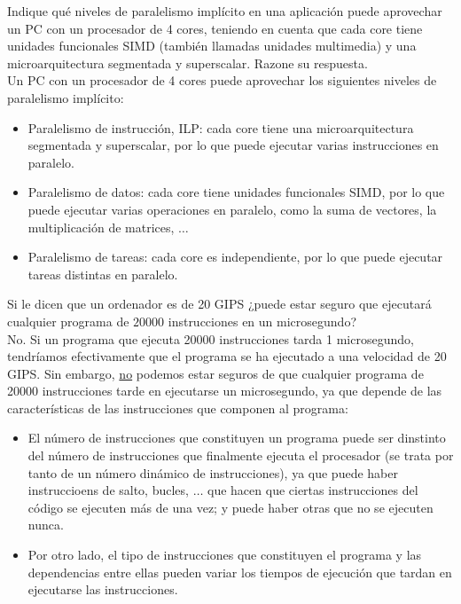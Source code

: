 \begin{cuestion}
    Indique qué niveles de paralelismo implícito en una aplicación puede aprovechar un PC con un
    procesador de 4 cores, teniendo en cuenta que cada core tiene unidades funcionales SIMD (también
    llamadas unidades multimedia) y una microarquitectura segmentada y superscalar. Razone su respuesta.\\

    Un PC con un procesador de 4 cores puede aprovechar los siguientes niveles de paralelismo implícito:
    \begin{itemize}
        \item Paralelismo de instrucción, ILP: cada core tiene una microarquitectura segmentada y superscalar, por lo que puede ejecutar varias instrucciones en paralelo.
        \item Paralelismo de datos: cada core tiene unidades funcionales SIMD, por lo que puede ejecutar varias operaciones en paralelo, como la suma de vectores, la multiplicación de matrices, $\ldots$
        \item Paralelismo de tareas: cada core es independiente, por lo que puede ejecutar tareas distintas en paralelo.
    \end{itemize}
\end{cuestion}

\begin{cuestion}
    Si le dicen que un ordenador es de 20 GIPS ¿puede estar seguro que ejecutará cualquier
    programa de $20000$ instrucciones en un microsegundo?\\

    No. Si un programa que ejecuta 20000 instrucciones tarda 1 microsegundo,
    tendríamos efectivamente que el programa se ha ejecutado a una velocidad de 20 GIPS.
    Sin embargo, \ul{no} podemos estar seguros de que cualquier programa de 20000
    instrucciones tarde en ejecutarse un microsegundo, ya que depende de las
    características de las instrucciones que componen al programa:
    \begin{itemize}
        \item El número de instrucciones que constituyen un programa puede ser dinstinto del número de instrucciones que finalmente ejecuta el procesador (se trata por tanto de un número dinámico de instrucciones), ya que puede haber instruccioens de salto, bucles, $\ldots$ que hacen que ciertas instrucciones del código se ejecuten más de una vez; y puede haber otras que no se ejecuten nunca.
        \item Por otro lado, el tipo de instrucciones que constituyen el programa y las dependencias entre ellas pueden variar los tiempos de ejecución que tardan en ejecutarse las instrucciones.
    \end{itemize}
\end{cuestion}

